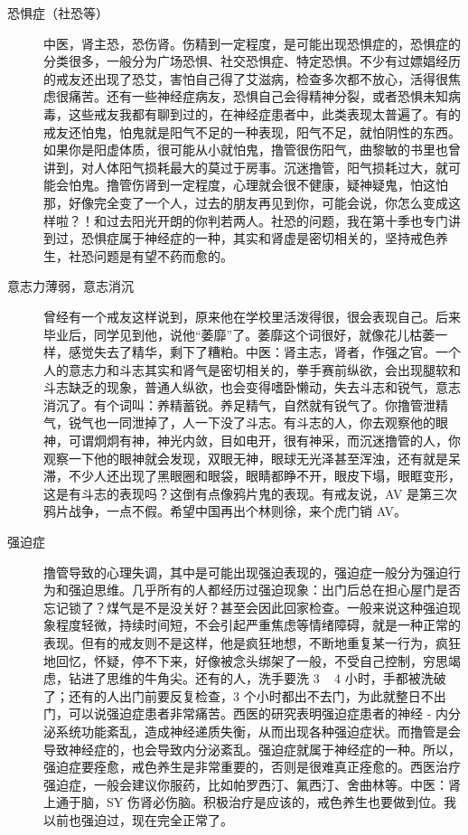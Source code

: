 \documentclass{ctexart}
\begin{document}
\begin{description}
    \item[恐惧症（社恐等）] 中医，肾主恐，恐伤肾。伤精到一定程度，是可能出现恐惧症的，恐惧症的分类很多，一般分为广场恐惧、社交恐惧症、特定恐惧。不少有过嫖娼经历的戒友还出现了恐艾，害怕自己得了艾滋病，检查多次都不放心，活得很焦虑很痛苦。还有一些神经症病友，恐惧自己会得精神分裂，或者恐惧未知病毒，这些戒友我都有聊到过的，在神经症患者中，此类表现太普遍了。有的戒友还怕鬼，怕鬼就是阳气不足的一种表现，阳气不足，就怕阴性的东西。如果你是阳虚体质，很可能从小就怕鬼，撸管很伤阳气，曲黎敏的书里也曾讲到，对人体阳气损耗最大的莫过于房事。沉迷撸管，阳气损耗过大，就可能会怕鬼。撸管伤肾到一定程度，心理就会很不健康，疑神疑鬼，怕这怕那，好像完全变了一个人，过去的朋友再见到你，可能会说，你怎么变成这样啦？！和过去阳光开朗的你判若两人。社恐的问题，我在第十季也专门讲到过，恐惧症属于神经症的一种，其实和肾虚是密切相关的，坚持戒色养生，社恐问题是有望不药而愈的。
    \item[意志力薄弱，意志消沉] 曾经有一个戒友这样说到，原来他在学校里活泼得很，很会表现自己。后来毕业后，同学见到他，说他“萎靡”了。萎靡这个词很好，就像花儿枯萎一样，感觉失去了精华，剩下了糟粕。中医：肾主志，肾者，作强之官。一个人的意志力和斗志其实和肾气是密切相关的，拳手赛前纵欲，会出现腿软和斗志缺乏的现象，普通人纵欲，也会变得嗜卧懒动，失去斗志和锐气，意志消沉了。有个词叫：养精蓄锐。养足精气，自然就有锐气了。你撸管泄精气，锐气也一同泄掉了，人一下没了斗志。有斗志的人，你去观察他的眼神，可谓炯炯有神，神光内敛，目如电开，很有神采，而沉迷撸管的人，你观察一下他的眼神就会发现，双眼无神，眼球无光泽甚至浑浊，还有就是呆滞，不少人还出现了黑眼圈和眼袋，眼睛都睁不开，眼皮下塌，眼眶变形，这是有斗志的表现吗？这倒有点像鸦片鬼的表现。有戒友说，AV 是第三次鸦片战争，一点不假。希望中国再出个林则徐，来个虎门销 AV。
    \item[强迫症] 撸管导致的心理失调，其中是可能出现强迫表现的，强迫症一般分为强迫行为和强迫思维。几乎所有的人都经历过强迫现象：出门后总在担心屋门是否忘记锁了？煤气是不是没关好？甚至会因此回家检查。一般来说这种强迫现象程度轻微，持续时间短，不会引起严重焦虑等情绪障碍，就是一种正常的表现。但有的戒友则不是这样，他是疯狂地想，不断地重复某一行为，疯狂地回忆，怀疑，停不下来，好像被念头绑架了一般，不受自己控制，穷思竭虑，钻进了思维的牛角尖。还有的人，洗手要洗 3 ~ 4 小时，手都被洗破了；还有的人出门前要反复检查，3 个小时都出不去门，为此就整日不出门，可以说强迫症患者非常痛苦。西医的研究表明强迫症患者的神经 - 内分泌系统功能紊乱，造成神经递质失衡，从而出现各种强迫症状。而撸管是会导致神经症的，也会导致内分泌紊乱。强迫症就属于神经症的一种。所以，强迫症要痊愈，戒色养生是非常重要的，否则是很难真正痊愈的。西医治疗强迫症，一般会建议你服药，比如帕罗西汀、氟西汀、舍曲林等。中医：肾上通于脑，SY 伤肾必伤脑。积极治疗是应该的，戒色养生也要做到位。我以前也强迫过，现在完全正常了。


\end{description}
\end{document}
